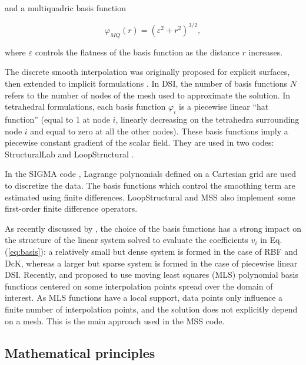\documentclass[preprint]{ring20}
\begin{document}
\noindent and a multiquadric basis function

\begin{equation}
\varphi_{MQ}(r) = (\varepsilon^2 + r^2)^{3/2},
\end{equation}

\noindent where $\varepsilon$ controls the flatness of the basis function as the distance $r$ increases. 

The discrete smooth interpolation \citep[DSI, ][]{Mallet1992CD} was originally proposed for explicit surfaces, then extended to implicit formulations \citep{Frank2007CG,Caumon2013GaRSITo,Souche20137ECEISE2,Laurent2016MG,Irakarama2021MG}. In DSI, the number of basis functions $N$ refers to the number of nodes of the mesh used to approximate the solution. In tetrahedral formulations, each basis function $\varphi_i$ is a piecewise linear ``hat function'' (equal to 1 at node $i$, linearly decreasing on the tetrahedra surrounding node $i$ and equal to zero at all the other nodes). These basis functions imply a piecewise constant gradient of the scalar field. They are used in two codes: StructuralLab \citep{Frank2007CG,Caumon2013GaRSITo} and LoopStructural \citep{Grose2021GMDa}. 

In the SIGMA code \cite{Irakarama2021MG}, Lagrange polynomials defined on a Cartesian grid are used to discretize the data. The basis functions which control the smoothing term are estimated using finite differences. LoopStructural and MSS also implement some first-order finite difference operators. 

As recently discussed by \citet{Renaudeau2019MG}, the choice of the basis functions has a strong impact on the structure of the linear system solved to evaluate the coefficients $v_i$ in Eq. (\ref{eq:basis}): a relatively small but dense system is formed in the case of RBF and DcK, whereas a larger but sparse system is formed in the case of piecewise linear DSI. Recently, \citet{Renaudeau2019MG} and \citet{Manchuk2019CG} proposed to use moving least squares (MLS) polynomial basis functions centered on some interpolation points spread over the domain of interest. As MLS functions have a local support, data points only influence a finite number of interpolation points, and the solution does not explicitly depend on a mesh. This is the main approach used in the MSS code. 

\subsection{Mathematical principles} 
\end{document}
